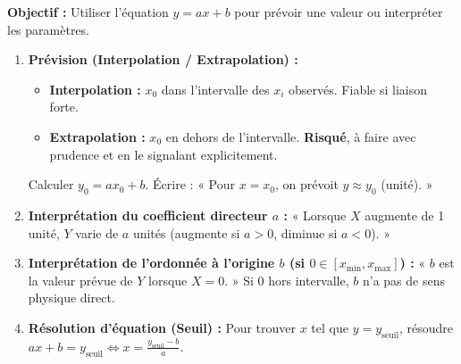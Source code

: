 \documentclass[11pt]{article}
\begin{document}
\begin{methode}
\textbf{Objectif :} Utiliser l'équation $y = ax + b$ pour prévoir une valeur ou interpréter les paramètres.
\begin{enumerate}
    \item \textbf{Prévision (Interpolation / Extrapolation) :}
    \begin{itemize}
        \item \textbf{Interpolation :} $x_0$ dans l'intervalle des $x_i$ observés. Fiable si liaison forte.
        \item \textbf{Extrapolation :} $x_0$ en dehors de l'intervalle. \textbf{Risqué}, à faire avec prudence et en le signalant explicitement.
    \end{itemize}
    Calculer $y_0 = ax_0 + b$. Écrire : « Pour $x = x_0$, on prévoit $y \approx y_0$ (unité). »
    \item \textbf{Interprétation du coefficient directeur $a$ :}
    « Lorsque $X$ augmente de 1 unité, $Y$ varie de $a$ unités (augmente si $a>0$, diminue si $a<0$). »
    \item \textbf{Interprétation de l'ordonnée à l'origine $b$ (si $0 \in [x_{\min}, x_{\max}]$) :}
    « $b$ est la valeur prévue de $Y$ lorsque $X=0$. » Si $0$ hors intervalle, $b$ n'a pas de sens physique direct.
    \item \textbf{Résolution d'équation (Seuil) :} Pour trouver $x$ tel que $y = y_{\text{seuil}}$, résoudre $ax + b = y_{\text{seuil}} \iff x = \frac{y_{\text{seuil}} - b}{a}$.
\end{enumerate}
\end{methode}
\end{document}
